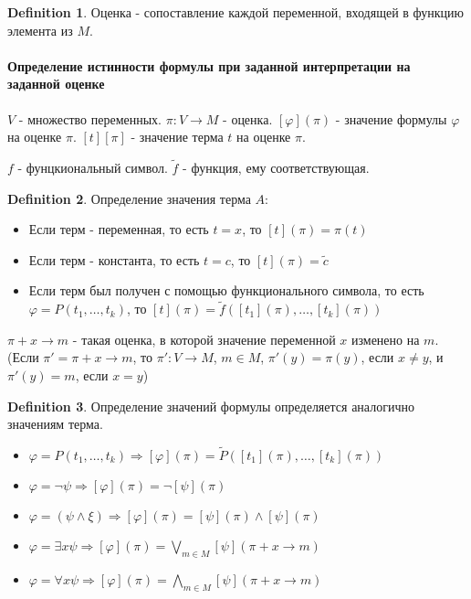 \documentclass[a4paper]{article}
\theoremstyle{plain}
\theoremstyle{remark}
\theoremstyle{definition}
\newtheorem{definition}{Definition}
\begin{document}
\begin{definition}
	Оценка - сопоставление каждой переменной, входящей в функцию элемента из $M$.
\end{definition}

\paragraph{Определение истинности формулы при заданной интерпретации на заданной оценке}

\begin{designation}
	$V$ - множество переменных. $\pi: V \rightarrow M$ - оценка. $[\varphi](\pi)$ - значение формулы $\varphi$ на оценке $\pi$. $[t][\pi]$ - значение терма $t$ на оценке $\pi$.
\end{designation}

\begin{designation}
	$f$ - фунцкиональный символ. $\tilde{f}$ - функция, ему соответствующая.
\end{designation}

\begin{definition}
	Определение значения терма $A$:
	\begin{itemize}
		\item Если терм - переменная, то есть $t = x$, то $[t](\pi) = \pi(t)$
		\item Если терм - константа, то есть $t = c$, то $[t](\pi) = \tilde{c}$
		\item Если терм был получен с помощью функционального символа, то есть $\varphi = P(t_1, \ldots, t_k)$, то $[t](\pi) = \tilde{f}([t_1](\pi), \ldots, [t_k](\pi))$
	\end{itemize}
\end{definition}

\begin{designation}
	$\pi + x \rightarrow m$ - такая оценка, в которой значение переменной $x$ изменено на $m$.(Если $\pi' = \pi + x \rightarrow m$, то $\pi': V \rightarrow M$, $m \in M$, $\pi'(y) = \pi(y)$, если $x \neq y$, и $\pi'(y) = m$, если $x = y$)
\end{designation}

\begin{definition}
	Определение значений формулы определяется аналогично значениям терма.
	\begin{itemize}
		\item $\varphi = P(t_1, \ldots, t_k) \Rightarrow [\varphi](\pi) = \tilde{P}([t_1](\pi), \ldots, [t_k](\pi))$
		\item $\varphi = \lnot \psi \Rightarrow [\varphi](\pi) = \lnot [\psi](\pi)$
		\item $\varphi = (\psi \land \xi) \Rightarrow [\varphi](\pi) = [\psi](\pi) \land [\psi](\pi)$
		\item $\varphi = \exists x \psi \Rightarrow [\varphi](\pi) = \bigvee_{m \in M} [\psi](\pi + x \rightarrow m)$
		\item $\varphi = \forall x \psi \Rightarrow [\varphi](\pi) = \bigwedge_{m \in M} [\psi](\pi + x \rightarrow m)$
	\end{itemize}
\end{definition}
\end{document}
